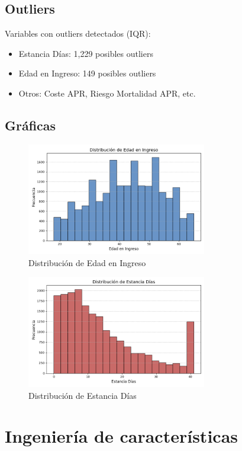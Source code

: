 \documentclass[a4paper,12pt]{article}
\begin{document}
\subsection{Outliers}
Variables con outliers detectados (IQR):
\begin{itemize}
  \item Estancia Días: 1,229 posibles outliers
  \item Edad en Ingreso: 149 posibles outliers
  \item Otros: Coste APR, Riesgo Mortalidad APR, etc.
\end{itemize}

\subsection{Gráficas}
\begin{figure}[h!]
  \centering
  \includegraphics[width=0.7\textwidth]{hist_edad.png}
  \caption{Distribución de Edad en Ingreso}
\end{figure}

\begin{figure}[h!]
  \centering
  \includegraphics[width=0.7\textwidth]{hist_estancia.png}
  \caption{Distribución de Estancia Días}
\end{figure}

\newpage
\section{Ingeniería de características}
\end{document}
